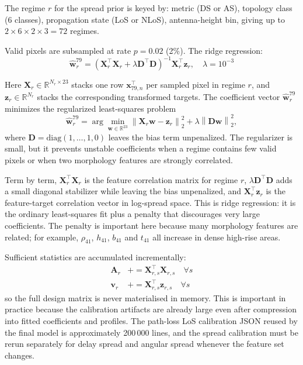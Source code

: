 The regime $r$ for the spread prior is keyed by: metric (DS or AS), topology class (6 classes), propagation state (LoS or NLoS), antenna-height bin, giving up to $2 \times 6 \times 2 \times 3 = 72$ regimes.

Valid pixels are subsampled at rate $p = 0.02$ (2\%). The ridge regression:
\begin{equation}
\hat{\textbf{w}}^{79}_{r} = \left(\textbf{X}_r^\top \textbf{X}_r + \lambda \textbf{D}^\top\textbf{D}\right)^{-1}\textbf{X}_r^\top \textbf{z}_r,\quad \lambda = 10^{-3}
\label{eq:ridge}
\end{equation}

Here \(\textbf{X}_r\in\mathbb{R}^{N_r\times23}\) stacks one row
\(\textbf{x}_{79,n}^{\top}\) per sampled pixel in regime \(r\), and
\(\textbf{z}_r\in\mathbb{R}^{N_r}\) stacks the corresponding transformed
targets. The coefficient vector
\(\hat{\textbf{w}}^{79}_{r}\) minimizes the regularized least-squares problem
\begin{equation}
\hat{\textbf{w}}^{79}_{r}
=
\arg\min_{\textbf{w}\in\mathbb{R}^{23}}
\left\|
\textbf{X}_r\textbf{w}-\textbf{z}_r
\right\|_2^2
+
\lambda
\left\|
\textbf{D}\textbf{w}
\right\|_2^2 ,
\label{eq:try79_ridge_objective}
\end{equation}
where \(\textbf{D}=\mathrm{diag}(1,\dots,1,0)\) leaves the bias term
unpenalized. The regularizer is small, but it prevents unstable coefficients
when a regime contains few valid pixels or when two morphology features are
strongly correlated.

Term by term, \(\textbf{X}_r^\top\textbf{X}_r\) is the feature correlation
matrix for regime \(r\), \(\lambda\textbf{D}^\top\textbf{D}\) adds a small
diagonal stabilizer while leaving the bias unpenalized, and
\(\textbf{X}_r^\top\textbf{z}_r\) is the feature-target
correlation vector in log-spread space. This is ridge regression: it is the
ordinary least-squares fit plus a penalty that discourages very large
coefficients. The penalty is important here because many morphology features
are related; for example, \(\rho_{41}\), \(h_{41}\), \(b_{41}\) and \(t_{41}\)
all increase in dense high-rise areas.

Sufficient statistics are accumulated incrementally:
\begin{align}
\textbf{A}_r &\mathrel{+}= \textbf{X}_{r,s}^\top \textbf{X}_{r,s} \quad \forall s\\
\textbf{v}_r &\mathrel{+}= \textbf{X}_{r,s}^\top \textbf{z}_{r,s} \quad \forall s
\end{align}
so the full design matrix is never materialised in memory.
This is important in practice because the calibration artifacts are already
large even after compression into fitted coefficients and profiles. The path-loss
LoS calibration JSON reused by the final model is approximately 200\,000 lines, and the
spread calibration must be rerun separately for delay spread and angular
spread whenever the feature set changes.

